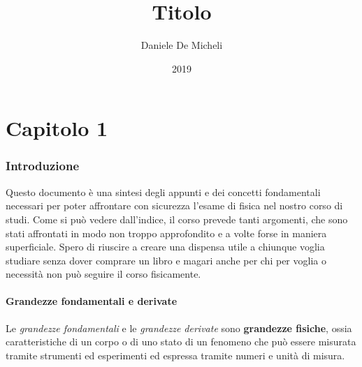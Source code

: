 \documentclass[11pt]{article}
\title{Titolo}
\author{Daniele De Micheli}
\date{2019}
\begin{document}
\maketitle
\tableofcontents

\part{Capitolo 1}
\section{Introduzione}
Questo documento è una sintesi degli appunti e dei concetti fondamentali necessari per poter affrontare con sicurezza l'esame di fisica nel nostro corso di studi. Come si può vedere dall'indice, il corso prevede tanti argomenti, che sono stati affrontati in modo non troppo approfondito e a volte forse in maniera superficiale. Spero di riuscire a creare una dispensa utile a chiunque voglia studiare senza dover comprare un libro e magari anche per chi per voglia o necessità non può seguire il corso fisicamente.
\subsection{Grandezze fondamentali e derivate}
Le \textit{grandezze fondamentali} e le \textit{grandezze derivate} sono \textbf{grandezze fisiche}, ossia caratteristiche di un corpo o di uno stato di un fenomeno che può essere misurata tramite strumenti ed esperimenti ed espressa tramite numeri e unità di misura.
\end{document}
